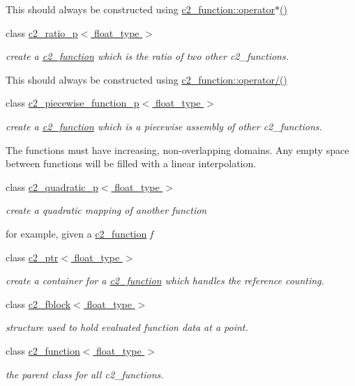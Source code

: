 \begin{DoxyCompactItemize}
\begin{DoxyCompactList}
This should always be constructed using \hyperlink{classc2__function_a7744675c98a8ec63320ac1c0b61bec9c}{c2\+\_\+function\+::operator$\ast$()} \end{DoxyCompactList}\item 
class \hyperlink{classc2__ratio__p}{c2\+\_\+ratio\+\_\+p$<$ float\+\_\+type $>$}
\begin{DoxyCompactList}\small\item\em create a \hyperlink{classc2__function}{c2\+\_\+function} which is the ratio of two other c2\+\_\+functions.

This should always be constructed using \hyperlink{classc2__function_a93ac28dfe5daebea84d147b8e346e60c}{c2\+\_\+function\+::operator/()} \end{DoxyCompactList}\item 
class \hyperlink{classc2__piecewise__function__p}{c2\+\_\+piecewise\+\_\+function\+\_\+p$<$ float\+\_\+type $>$}
\begin{DoxyCompactList}\small\item\em create a \hyperlink{classc2__function}{c2\+\_\+function} which is a piecewise assembly of other c2\+\_\+functions.

The functions must have increasing, non-\/overlapping domains. Any empty space between functions will be filled with a linear interpolation. \end{DoxyCompactList}\item 
class \hyperlink{classc2__quadratic__p}{c2\+\_\+quadratic\+\_\+p$<$ float\+\_\+type $>$}
\begin{DoxyCompactList}\small\item\em create a quadratic mapping of another function

for example, given a \hyperlink{classc2__function}{c2\+\_\+function} {\itshape f} \end{DoxyCompactList}\item 
class \hyperlink{classc2__ptr}{c2\+\_\+ptr$<$ float\+\_\+type $>$}
\begin{DoxyCompactList}\small\item\em create a container for a \hyperlink{classc2__function}{c2\+\_\+function} which handles the reference counting. \end{DoxyCompactList}\item 
class \hyperlink{classc2__fblock}{c2\+\_\+fblock$<$ float\+\_\+type $>$}
\begin{DoxyCompactList}\small\item\em structure used to hold evaluated function data at a point. \end{DoxyCompactList}\item 
class \hyperlink{classc2__function}{c2\+\_\+function$<$ float\+\_\+type $>$}
\begin{DoxyCompactList}\small\item\em the parent class for all c2\+\_\+functions.


\end{DoxyCompactList}
\end{DoxyCompactItemize}
